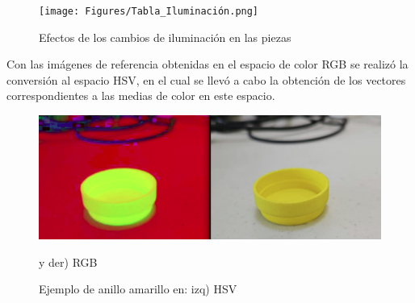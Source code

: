 \begin{figure}[ht]
\centering
\texttt{[image: Figures/Tabla\_Iluminación.png]}
    \caption{Efectos de los cambios de iluminación en las piezas}
    \label{fig:Ilumination}
\end{figure}

Con las imágenes de referencia obtenidas en el espacio de color RGB se realizó la conversión al espacio HSV, en el cual se llevó a cabo la obtención de los vectores correspondientes a las medias de color en este espacio.

\begin{figure}[ht]
\centering
\includegraphics[scale= 0.3]{Figures/HSV_YellowRing.png}
    \caption{Ejemplo de anillo amarillo en: izq) HSV} y der) RGB
    \label{fig:YellowRing_HSV}
\end{figure}

